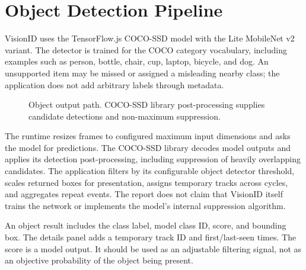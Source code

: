 \documentclass[11pt,oneside,openany]{report}
\begin{document}
\chapter{Object Detection Pipeline}
VisionID uses the TensorFlow.js COCO-SSD model with the Lite MobileNet v2 variant. The detector is trained for the COCO category vocabulary, including examples such as person, bottle, chair, cup, laptop, bicycle, and dog. An unsupported item may be missed or assigned a misleading nearby class; the application does not add arbitrary labels through metadata.

\begin{figure}[htbp]
\centering
{}
\caption{Object output path. COCO-SSD library post-processing supplies candidate detections and non-maximum suppression.}
\label{fig:object-pipeline}
\end{figure}

The runtime resizes frames to configured maximum input dimensions and asks the model for predictions. The COCO-SSD library decodes model outputs and applies its detection post-processing, including suppression of heavily overlapping candidates. The application filters by its configurable object detector threshold, scales returned boxes for presentation, assigns temporary tracks across cycles, and aggregates repeat events. The report does not claim that VisionID itself trains the network or implements the model's internal suppression algorithm.

An object result includes the class label, model class ID, score{}, and bounding box. The details panel adds a temporary track ID and first/last-seen times. The score is a model output. It should be used as an adjustable filtering signal, not as an objective probability of the object being present.
\end{document}
